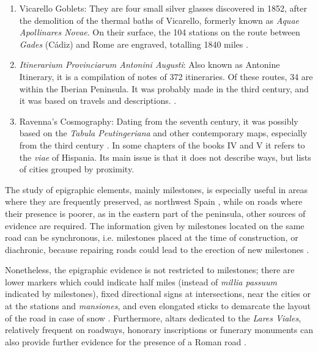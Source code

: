 	\begin{enumerate}
		\item Vicarello Goblets: They are four small silver glasses discovered in 1852, after the demolition of the thermal baths of Vicarello, formerly known as \textit{Aquae Apollinares Novae}. On their surface, the 104 stations on the route between \textit{Gades} (Cádiz) and Rome are engraved, totalling 1840 miles \parencite[104]{Benítez_2012}.
		\item \textit{Itinerarium Provinciarum Antonini Augusti}: Also known as Antonine Itinerary, it is a compilation of notes of 372 itineraries. Of these routes, 34 are within the Iberian Peninsula. It was probably made in the third century, and it was based on travels and descriptions.  \parencites[83--116]{Arias_1987}[38--101]{Roldán_1975}.
		\item Ravenna’s Cosmography: Dating from the seventh century, it was possibly based on the \textit{Tabula Peutingeriana} and other contemporary maps, especially from the third century \parencite[112--113]{Roldán_1975}. In some chapters of the books IV and V it refers to the \textit{viae} of Hispania. Its main issue is that it does not describe ways, but lists of cities grouped by proximity.
	\end{enumerate}	
	The study of epigraphic elements, mainly milestones, is especially useful in areas where they are frequently preserved, as northwest Spain \parencite[30]{Rodriguez_2004}, while on roads where their presence is poorer, as in the eastern part of the peninsula, other sources of evidence are required. The information given by milestones located on the same road can be synchronous, i.e. milestones placed at the time of construction, or diachronic, because repairing roads could lead to the erection of new milestones \parencite[159--160]{Moreno_2004}. 
	
	Nonetheless, the epigraphic evidence is not restricted to milestones; there are lower markers which could indicate half miles (instead of \textit{millia passuum} indicated by milestones), fixed directional signs at intersections, near the cities or at the stations and \textit{mansiones}, and even elongated sticks to demarcate the layout of the road in case of snow \parencite[161--164]{Moreno_2004}. Furthermore, altars dedicated to the \textit{Lares Viales}, relatively frequent on roadways, honorary inscriptions or funerary monuments can also provide further evidence for the presence of a Roman road \parencites[759--766]{Rodriguez_2004}[73--75]{Chevallier_1997}.
	
